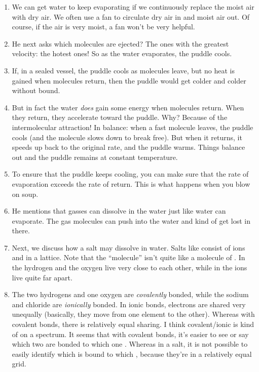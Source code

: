 \begin{enumerate}
  \item We can get water to keep evaporating if we continuously replace
  the moist air with dry air. We often use a fan to circulate dry air in
  and moist air out. Of course, if the air is very moist, a fan won't be
  very helpful.

  \item He next asks which molecules are ejected? The ones with the
  greatest velocity: the hotest ones! So as the water evaporates, the
  puddle cools.

  \item If, in a sealed vessel, the puddle cools as molecules leave, but
  no heat is gained when molecules return, then the puddle would get
  colder and colder without bound.

  \item But in fact the water \emph{does} gain some energy when
  molecules return. When they return, they accelerate toward the puddle.
  Why? Because of the intermolecular attraction! In balance: when a fast
  molecule leaves, the puddle cools (and the molecule slows down to
  break free). But when it returns, it speeds up back to the original
  rate, and the puddle warms. Things balance out and the puddle remains
  at constant temperature.

  \item To ensure that the puddle keeps cooling, you can make sure that
  the rate of evaporation exceeds the rate of return. This is what
  happens when you blow on soup.

  \item He mentions that gasses can dissolve in the water just like
  water can evaporate. The gas molecules can push into the water and
  kind of get lost in there.

  \item Next, we discuss how a salt may dissolve in water. Salts like
   consist of ions  and  in a lattice. Note
  that the ``molecule''  isn't quite like a molecule of
  . In  the hydrogen and the oxygen live very close to
  each other, while in  the ions live quite far apart.

  \item The two hydrogens and one oxygen are \emph{covalently} bonded,
  while the sodium and chloride are \emph{ionically} bonded. In ionic
  bonds, electrons are shared very unequally (basically, they move from
  one element to the other). Whereas with covalent bonds, there is
  relatively equal sharing. I think covalent/ionic is kind of on a
  spectrum. It seems that with covalent bonds, it's easier to see or say
  which two  are bonded to which one . Whereas in a salt, it
  is not possible to easily identify which  is bound to which
  , because they're in a relatively equal grid.


\end{enumerate}
